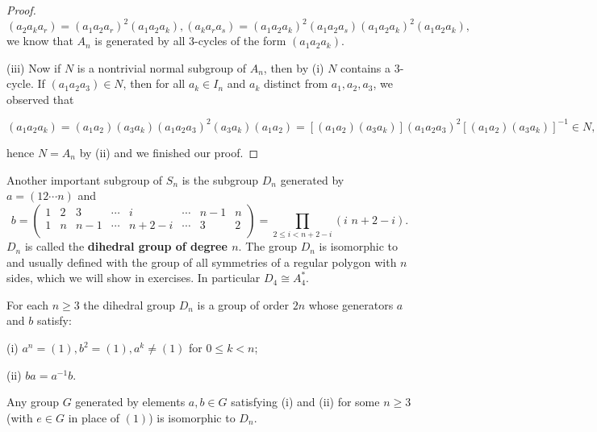 \begin{proof}
$$$$
$$
\left( a_2a_ka_r \right) =\left( a_1a_2a_r \right) ^2\left( a_1a_2a_k \right) ,\left( a_ka_ra_s \right) =\left( a_1a_2a_k \right) ^2\left( a_1a_2a_s \right) \left( a_1a_2a_k \right) ^2\left( a_1a_2a_k \right) ,
$$
we know that $A_n$ is generated by all $3$-cycles of the form $(a_1a_2a_k)$.\par
(iii) Now if $N$ is a nontrivial normal subgroup of $A_n$, then by (i) $N$ contains a $3$-cycle. If $(a_1a_2a_3)\in N$, then for all $a_k\in I_n$ and $a_k$ distinct from $a_1,a_2,a_3$, we observed that 
\begin{small}
$$
\left( a_1a_2a_k \right) =\left( a_1a_2 \right) \left( a_3a_k \right) \left( a_1a_2a_3 \right) ^2\left( a_3a_k \right) \left( a_1a_2 \right) =\left[ \left( a_1a_2 \right) \left( a_3a_k \right) \right] \left( a_1a_2a_3 \right) ^2\left[ \left( a_1a_2 \right) \left( a_3a_k \right) \right] ^{-1}\in N,
$$    
\end{small}
hence $N=A_n$ by (ii) and we finished our proof.
\end{proof}
Another important subgroup of $S_n$ is the subgroup $D_n$ generated by $a=(12\cdots n)$ and 
$$
b=\left( \begin{matrix}
	1&		2&		3&		\cdots&		i&		\cdots&		n-1&		n\\
	1&		n&		n-1&		\cdots&		n+2-i&		\cdots&		3&		2\\
\end{matrix} \right) =\prod_{2\le i<n+2-i}{\left( i\,\,n+2-i \right)}.
$$
$D_n$ is called the \textbf{dihedral group of degree $n$}. The group $D_n$ is isomorphic to and usually defined with the group of all symmetries of a regular polygon with $n$ sides, which we will show in exercises. In particular $D_4\cong A_4^*$.
\begin{theorem}
For each $n\ge 3$ the dihedral group $D_n$ is a group of order $2n$ whose generators $a$ and $b$ satisfy: \par
(i) $a^n=(1),b^2=(1),a^k\ne(1)$ for $0\le k<n$;\par
(ii) $ba=a^{-1}b$.\par
Any group $G$ generated by elements $a,b\in G$ satisfying (i) and (ii) for some $n\ge 3$(with $e\in G$ in place of $(1)$) is isomorphic to $D_n$.
\end{theorem}
